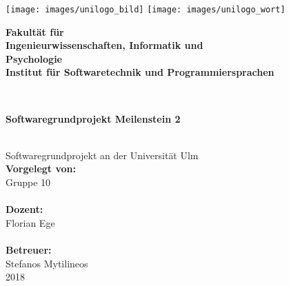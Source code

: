 \documentclass[a4paper,12pt,
headsepline,           %
oneside,               %
pointlessnumbers,      %
bibtotoc,              %
]{scrartcl}
\newcommand{\fullname}{Gruppe 10}
\newcommand{\titel}{Softwaregrundprojekt Meilenstein 2}
\newcommand{\jahr}{2018}
\newcommand{\dozent}{Florian Ege}
\newcommand{\betreuer}{Stefanos Mytilineos}
\newcommand{\fakultaet}{Ingenieurwissenschaften, Informatik und\\Psychologie}
\newcommand{\institut}{Institut für Softwaretechnik und Programmiersprachen}
\begin{document}
    \thispagestyle{empty}
    \begin{addmargin*}[4mm]{-10mm}

        \texttt{[image: images/unilogo\_bild]}
        \hfill
        \texttt{[image: images/unilogo\_wort]}\\[1em]

        {\footnotesize
        \hspace*{115mm}\parbox[t]{35mm}{\bfseries Fakultät für\\
        \fakultaet\\
        \mdseries \institut}\\[2cm]

        \parbox{140mm}{\bfseries \LARGE \titel}\\[2.5em]
        {\footnotesize Softwaregrundprojekt an der Universität Ulm}\\[3em]

        {\footnotesize \bfseries Vorgelegt von:}\\
        {\footnotesize \fullname\\}\\ [1em]
        {\footnotesize \bfseries Dozent:}\\
        {\footnotesize \dozent\\}\\[1em]
        {\footnotesize \bfseries Betreuer:}\\
        {\footnotesize \betreuer}\\ [1em]
        {\footnotesize \jahr}
        }
    \end{addmargin*}
    \pagebreak
    \tableofcontents
    \pagebreak

    

    
\end{document}
